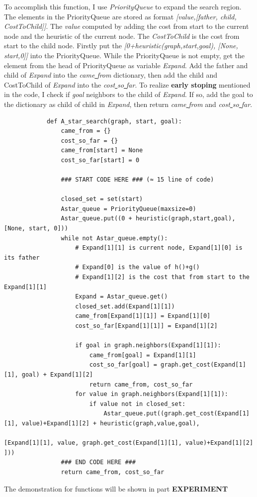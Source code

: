 \documentclass[aps,letterpaper,10pt]{revtex4}
\newcommand{\RNum}[1]{\uppercase\expandafter{\romannumeral #1\relax}}
\begin{document}
\begin{itemize}
\begin{itemize}
		To accomplish this function, I use \emph{PriorityQueue} to expand the search region. The elements in the PriorityQueue are stored as format \emph{[value,[father, child, CostToChild]]}. The \emph{value} computed by adding the cost from start to the current node and the heuristic of the current node. 
		The \emph{CostToChild} is the cost from start to the child node. 
		Firstly put the \emph{[0+heuristic(graph,start,goal), [None, start,0]]} into the PriorityQueue. While the PriorityQueue is not empty, get the element from the head of PriorityQueue as variable \emph{Expand}.
		Add the father and child of \emph{Expand} into the \emph{came\underline{ }from} dictionary, then add the child and CostToChild of \emph{Expand} into the \emph{cost\underline{ }so\underline{ }far}. 
		To realize \textbf{early stoping} mentioned in the code, I check if \emph{goal} neighbors to the child of \emph{Expand}. If so, add the goal to the dictionary as
		child of child in \emph{Expand}, then return \emph{came\underline{ }from} and \emph{cost\underline{ }so\underline{ }far}.

		\begin{lstlisting}
			def A_star_search(graph, start, goal):
				came_from = {}
				cost_so_far = {}
				came_from[start] = None
				cost_so_far[start] = 0

				### START CODE HERE ### (≈ 15 line of code)

				closed_set = set(start)
				Astar_queue = PriorityQueue(maxsize=0)
				Astar_queue.put((0 + heuristic(graph,start,goal), [None, start, 0]))
				while not Astar_queue.empty():
					# Expand[1][1] is current node, Expand[1][0] is its father
					# Expand[0] is the value of h()+g()
					# Expand[1][2] is the cost that from start to the Expand[1][1]
					Expand = Astar_queue.get()
					closed_set.add(Expand[1][1])
					came_from[Expand[1][1]] = Expand[1][0]
					cost_so_far[Expand[1][1]] = Expand[1][2]

					if goal in graph.neighbors(Expand[1][1]):
						came_from[goal] = Expand[1][1]
						cost_so_far[goal] = graph.get_cost(Expand[1][1], goal) + Expand[1][2]
						return came_from, cost_so_far
					for value in graph.neighbors(Expand[1][1]):
						if value not in closed_set:
							Astar_queue.put((graph.get_cost(Expand[1][1], value)+Expand[1][2] + heuristic(graph,value,goal),
																[Expand[1][1], value, graph.get_cost(Expand[1][1], value)+Expand[1][2] ]))
				### END CODE HERE ###
				return came_from, cost_so_far
		\end{lstlisting}
		
		The demonstration for functions will be shown in part \textbf{\RNum{2} EXPERIMENT} 

	\end{itemize} 


\end{itemize}
\end{document}
